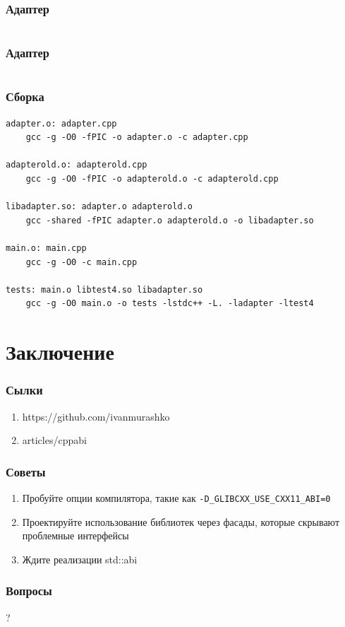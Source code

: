 \documentclass{beamer}
\begin{document}
\begin{frame}[fragile]
\frametitle{Адаптер}
\inputminted{c++}{../src/adapterold.cpp}
\end{frame}

\begin{frame}[fragile]
\frametitle{Адаптер}
\inputminted{c++}{../src/adapter.cpp}
\end{frame}

\begin{frame}[fragile]
\frametitle{Сборка}
\begin{verbatim}
adapter.o: adapter.cpp
	gcc -g -O0 -fPIC -o adapter.o -c adapter.cpp

adapterold.o: adapterold.cpp
	gcc -g -O0 -fPIC -o adapterold.o -c adapterold.cpp

libadapter.so: adapter.o adapterold.o
	gcc -shared -fPIC adapter.o adapterold.o -o libadapter.so 

main.o: main.cpp
	gcc -g -O0 -c main.cpp 

tests: main.o libtest4.so libadapter.so
	gcc -g -O0 main.o -o tests -lstdc++ -L. -ladapter -ltest4
\end{verbatim}
\end{frame}

\section{Заключение}

\begin{frame}[fragile]
\frametitle{Сылки}
\begin{enumerate}
\item https://github.com/ivanmurashko
\item articles/cppabi
\end{enumerate}
\end{frame}

\begin{frame}[fragile]
\frametitle{Советы}
\begin{enumerate}
\item Пробуйте опции компилятора, такие как
  \texttt{-D\_GLIBCXX\_USE\_CXX11\_ABI=0}
\item Проектируйте использование библиотек через фасады, которые
  скрывают проблемные интерфейсы
\item Ждите реализации std::abi
\end{enumerate}
\end{frame}

\begin{frame}[fragile]
\frametitle{Вопросы}
?
\end{frame}
\end{document}
